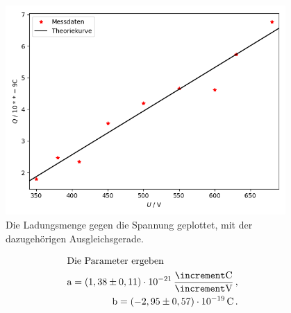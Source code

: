 \begin{figure}[H]
    \centering
    \includegraphics[height=80mm]{bilder/2.png}
    \caption{Die Ladungsmenge gegen die Spannung geplottet, mit der dazugehörigen Ausgleichsgerade. \label{Abbildung8} }
\end{figure}

\begin{align*}
    \intertext{Die Parameter ergeben}
    \text{a} = ( 1,38 \pm 0,11 ) \cdot 10^{-21}\,\frac{\increment \unit{\coulomb}}{\increment \unit{\volt}}\,, \\
    \text{b} = ( -2,95 \pm 0,57 ) \cdot 10^{-19}\, \unit{\coulomb}\,.
\end{align*}